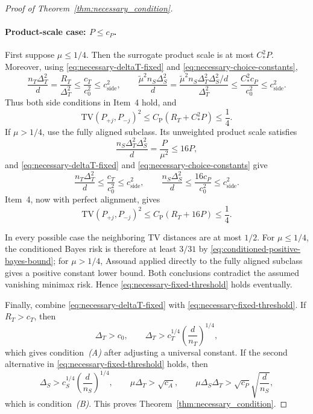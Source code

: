 \documentclass[10pt]{article}
\newcommand{\TV}{\mathrm{TV}}
\newcommand{\trg}{T}
\newcommand{\nT}{n_{\trg}}
\newcommand{\DeltaT}{\Delta_{\trg}}
\newcommand{\src}{S}
\newcommand{\nS}{n_{\src}}
\newcommand{\DeltaS}{\Delta_{\src}}
\begin{document}
\begin{proof}[Proof of Theorem~\ref{thm:necessary_condition}]
\paragraph{Product-scale case: $P\le c_P$.}
First suppose $\mu\le1/4$. Then the surrogate product scale is at most
$C_*^2P$. Moreover, using \eqref{eq:necessary-deltaT-fixed} and
\eqref{eq:necessary-choice-constants},
\[
    \frac{\nT\DeltaT^2}{d}=\frac{R_T}{\DeltaT^2}
    \le\frac{c_T}{c_0^2}\le c_{\mathrm{side}}^2,
    \qquad
    \frac{\tilde\mu^2\nS\DeltaS^2}{d}
    =\frac{\tilde\mu^2\nS\DeltaT^2\DeltaS^2/d}{\DeltaT^2}
    \le\frac{C_*^2c_P}{c_0^2}\le c_{\mathrm{side}}^2.
\]
Thus both side conditions in Item~4 hold, and
\[
    \TV(P_{+j},P_{-j})^2
    \le C_{\mathrm P}(R_T+C_*^2P)\le\frac14.
\]
If $\mu>1/4$, use the fully aligned subclass. Its unweighted product scale
satisfies
\[
    \frac{\nS\DeltaT^2\DeltaS^2}{d}=\frac{P}{\mu^2}\le16P,
\]
and \eqref{eq:necessary-deltaT-fixed} and
\eqref{eq:necessary-choice-constants} give
\[
    \frac{\nT\DeltaT^2}{d}
    \le\frac{c_T}{c_0^2}\le c_{\mathrm{side}}^2,
    \qquad
    \frac{\nS\DeltaS^2}{d}
    \le\frac{16c_P}{c_0^2}\le c_{\mathrm{side}}^2.
\]
Item~4, now with perfect alignment, gives
\[
    \TV(P_{+j},P_{-j})^2
    \le C_{\mathrm P}(R_T+16P)\le\frac14.
\]

In every possible case the neighboring TV distances are at most $1/2$.
For $\mu\le1/4$, the conditioned Bayes risk is therefore at least $3/31$ by
\eqref{eq:conditioned-positive-bayes-bound}; for $\mu>1/4$, Assouad applied
directly to the fully aligned subclass gives a positive constant lower bound.
Both conclusions contradict the assumed vanishing minimax risk. Hence
\eqref{eq:necessary-fixed-threshold} holds eventually.

Finally, combine \eqref{eq:necessary-deltaT-fixed} with
\eqref{eq:necessary-fixed-threshold}. If $R_T>c_T$, then
\[
    \DeltaT>c_0,
    \qquad
    \DeltaT>c_T^{1/4}\left(\frac d{\nT}\right)^{1/4},
\]
which gives condition~\emph{(A)} after adjusting a universal constant. If the
second alternative in \eqref{eq:necessary-fixed-threshold} holds, then
\[
    \DeltaS>c_S^{1/4}\left(\frac d{\nS}\right)^{1/4},
    \qquad
    \mu\DeltaT>\sqrt{c_A},
    \qquad
    \mu\DeltaS\DeltaT>\sqrt{c_P}\sqrt{\frac d{\nS}},
\]
which is condition~\emph{(B)}. This proves
Theorem~\ref{thm:necessary_condition}.
\end{proof}
\end{document}

